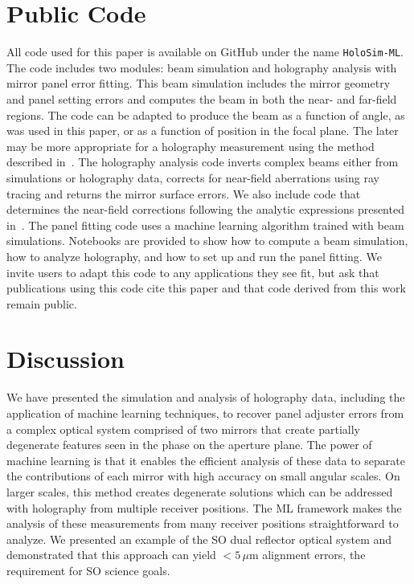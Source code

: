 \section{Public Code}
\label{sec:code}
All code used for this paper is available on GitHub under the name \verb|HoloSim-ML|. The code includes two modules: beam simulation and holography analysis with mirror panel error fitting.  This beam simulation includes the mirror geometry and panel setting errors and computes the beam in both the near- and far-field regions.  The code can be adapted to produce the beam as a function of angle, as was used in this paper, or as a function of position in the focal plane.  The later may be more appropriate for a holography measurement using the method described in~\cite{fyst_holog}. The holography analysis code inverts complex beams either from simulations or holography data, corrects for near-field aberrations using ray tracing and returns the mirror surface errors.  We also include code that determines the near-field corrections following the analytic expressions presented in~\cite{alma_holog}.  The panel fitting code uses a machine learning algorithm  trained with beam simulations.  Notebooks are provided to show how to compute a beam simulation, how to analyze holography, and how to set up and run the panel fitting.  We invite users to adapt this code to any applications they see fit, but ask that publications using this code cite this paper and that code derived from this work remain public.

\section{Discussion}
\label{sec:holosim_conclusion}
We have presented the simulation and analysis of holography data, including the application of machine learning techniques, to recover panel adjuster errors from a complex optical system comprised of two mirrors that create partially degenerate features seen in the phase on the aperture plane.  The power of machine learning is that it enables the efficient analysis of these data to separate the contributions of each mirror with high accuracy on small angular scales.  On larger scales, this method creates degenerate solutions which can be addressed with holography from multiple receiver positions.  The ML framework makes the analysis of these measurements from many receiver positions straightforward to analyze.  We presented an example of the SO dual reflector optical system and demonstrated that this approach can yield $<5\,\mu$m alignment errors, the requirement for SO science goals.


